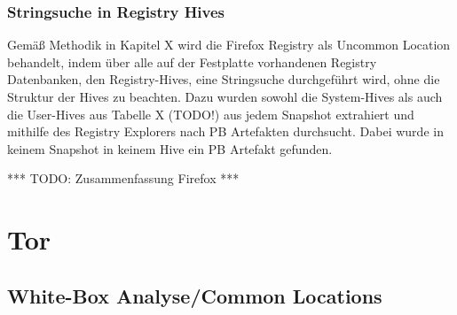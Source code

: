 \subsubsection*{Stringsuche in Registry Hives}
Gemäß Methodik in Kapitel X wird die Firefox Registry als Uncommon Location behandelt, indem über alle auf der Festplatte vorhandenen Registry Datenbanken, den Registry-Hives, eine Stringsuche durchgeführt wird, ohne die Struktur der Hives zu beachten. 
Dazu wurden sowohl die System-Hives als auch die User-Hives aus Tabelle X (TODO!) aus jedem Snapshot extrahiert und mithilfe des Registry Explorers nach PB Artefakten durchsucht.
Dabei wurde in keinem Snapshot in keinem Hive ein PB Artefakt gefunden.



*** TODO: Zusammenfassung Firefox ***


\newpage




\section{Tor}

\subsection*{White-Box Analyse/Common Locations}

